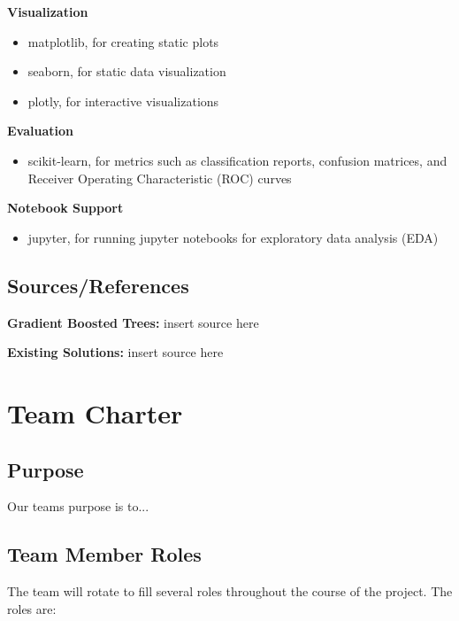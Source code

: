 \documentclass{article}
\begin{document}
\textbf{Visualization}
\begin{itemize}
    \item matplotlib, for creating static plots
    \item seaborn, for static data visualization
    \item plotly, for interactive visualizations
\end{itemize}

\textbf{Evaluation}
\begin{itemize}
    \item scikit-learn, for metrics such as classification reports, confusion matrices, and Receiver Operating Characteristic (ROC) curves
\end{itemize}

\textbf{Notebook Support}
\begin{itemize}
    \item jupyter, for running jupyter notebooks for exploratory data analysis (EDA)
\end{itemize}

\subsection*{Sources/References}
\textbf{Gradient Boosted Trees:} insert source here

\textbf{Existing Solutions:} insert source here
\medskip

\newpage
\section{Team Charter}
\subsection{Purpose}

Our teams purpose is to...\\

\subsection{Team Member Roles}

The team will rotate to fill several roles throughout the course of the project. The roles are: 
\end{document}
